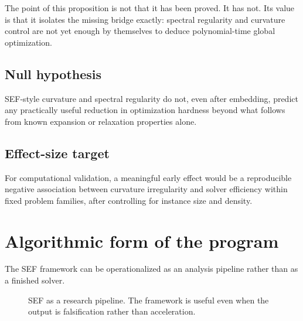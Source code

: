 \documentclass{svjour3}
\begin{document}
The point of this proposition is not that it has been proved. It has not. Its value is that it isolates the missing bridge exactly: spectral regularity and curvature control are not yet enough by themselves to deduce polynomial-time global optimization.

\subsection*{Null hypothesis}
SEF-style curvature and spectral regularity do not, even after embedding, predict any practically useful reduction in optimization hardness beyond what follows from known expansion or relaxation properties alone.

\subsection*{Effect-size target}
For computational validation, a meaningful early effect would be a reproducible negative association between curvature irregularity and solver efficiency within fixed problem families, after controlling for instance size and density.

\section{Algorithmic form of the program}
The SEF framework can be operationalized as an analysis pipeline rather than as a finished solver.

\begin{figure}[t]
\centering
{}
\caption{SEF as a research pipeline. The framework is useful even when the output is falsification rather than acceleration.}
\label{fig:sef-pipeline}
\end{figure}
\end{document}
